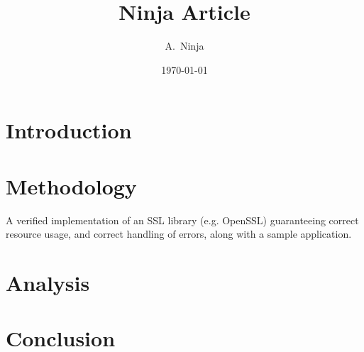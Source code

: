 \documentclass{sta-article}
\title{Ninja Article}
\author{A.\ Ninja}
\date{\today}
\date{\printdate{2014-03-30}}
\begin{document}
\maketitle

\chapter{Introduction}

\chapter{Methodology}
A verified implementation of an SSL library (e.g. OpenSSL) guaranteeing correct resource usage, and correct handling of errors, along with a sample application.

\chapter{Analysis}

\chapter{Conclusion}
\end{document}
